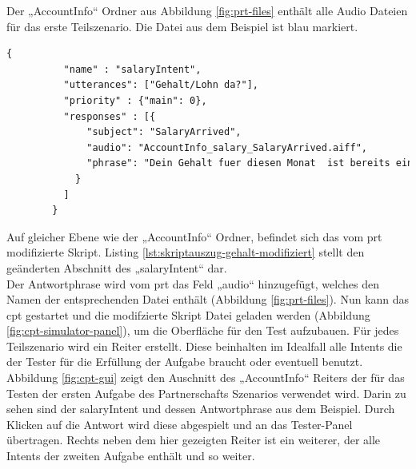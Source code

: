 Der „AccountInfo“ Ordner aus Abbildung \ref{fig:prt-files} enthält alle Audio Dateien für das erste Teilszenario. Die Datei aus dem Beispiel ist blau markiert. \newpage

\begin{lstlisting}[language={HTML},caption={Beispiel-Abschnitt nach der Modifikation durch das prt},label={lst:skriptauszug-gehalt-modifiziert}]
{
          "name" : "salaryIntent",
          "utterances": ["Gehalt/Lohn da?"],
          "priority" : {"main": 0},
          "responses" : [{
              "subject": "SalaryArrived",
              "audio": "AccountInfo_salary_SalaryArrived.aiff",
              "phrase": "Dein Gehalt fuer diesen Monat  ist bereits eingegangen"
            }
          ]
        }
\end{lstlisting} 

Auf gleicher Ebene wie der „AccountInfo“ Ordner, befindet sich das vom \ac{prt} modifizierte Skript. Listing \ref{lst:skriptauszug-gehalt-modifiziert} stellt den geänderten Abschnitt des „salaryIntent“ dar.\\ 
Der Antwortphrase wird vom \ac{prt} das Feld „audio“ hinzugefügt, welches den Namen der entsprechenden Datei enthält (\vgl Abbildung \ref{fig:prt-files}). Nun kann das \ac{cpt} gestartet und die modifzierte Skript Datei geladen werden (\vgl Abbildung \ref{fig:cpt-simulator-panel}), um die Oberfläche für den Test aufzubauen. Für jedes Teilszenario wird ein Reiter erstellt. Diese beinhalten im Idealfall alle Intents die der Tester für die Erfüllung der Aufgabe braucht oder eventuell benutzt. Abbildung \ref{fig:cpt-gui} zeigt den Auschnitt des „AccountInfo“ Reiters der für das Testen der ersten Aufgabe des Partnerschafts Szenarios verwendet wird. Darin zu sehen sind der salaryIntent und dessen Antwortphrase aus dem Beispiel. Durch Klicken auf die Antwort wird diese abgespielt und an das Tester-Panel übertragen. Rechts neben dem hier gezeigten Reiter ist ein weiterer, der alle Intents der zweiten Aufgabe enthält und so weiter.

